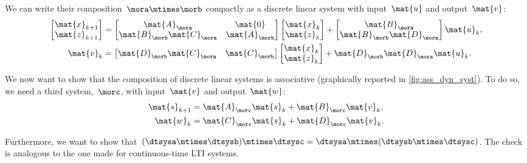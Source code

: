 We can write their composition~$\mora\mtimes \morb$ compactly as a discrete linear system with input~$\mat{u}$ and output~$\mat{v}$:
%
\begin{equation*}
    \label{eq:dlin-3}
    \begin{aligned}
        \begin{bmatrix}
            \mat{x}_{k+1} \\
            \mat{z}_{k+1}
        \end{bmatrix} & =
        \begin{bmatrix}
            \mat{A}_\mora               & \mat{0}       \\
            \mat{B}_\morb \mat{C}_\mora & \mat{A}_\morb
        \end{bmatrix}
        \begin{bmatrix}
            \mat{x}_k \\ \mat{z}_k
        \end{bmatrix}
        +
        \begin{bmatrix}
            \mat{B}_\mora \\ \mat{B}_\morb \mat{D}_\mora
        \end{bmatrix}\mat{u}_k, \\
        \mat{v}_k        & =
        \begin{bmatrix}
            \mat{D}_\morb \mat{C}_\mora & \mat{C}_\morb
        \end{bmatrix}
        \begin{bmatrix}
            \mat{x}_k \\ \mat{z}_k
        \end{bmatrix}+ \mat{D}_\morb \mat{D}_\mora \mat{u}_k.
    \end{aligned}
\end{equation*}

We now want to show that the composition of discrete linear systems is associative (graphically reported in \cref{fig:ass_dyn_syst}).
To do so, we need a third system,~$\morc$, with input~$\mat{v}$ and output~$\mat{w}$:
\begin{equation*}
    \label{eq:dlin-4}
    \begin{aligned}
        \mat{s}_{k+1} & = \mat{A}_\morc \mat{s}_k + \mat{B}_\morc \mat{v}_k, \\
        \mat{w}_{k}   & = \mat{C}_\morc \mat{s}_k+ \mat{D}_\morc \mat{v}_k.
    \end{aligned}
\end{equation*}

Furthermore, we want to show that~$(\dtsysa\mtimes \dtsysb)\mtimes \dtsysc=\dtsysa\mtimes (\dtsysb\mtimes \dtsysc)$.
The check is analogous to the one made for continuous-time LTI systems.

